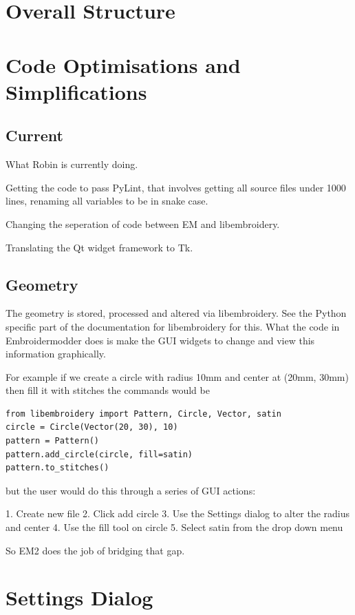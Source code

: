 \documentclass[11pt]{report}
\begin{document}
\section{Overall Structure}

\section{Code Optimisations and Simplifications}

\subsection{Current}

What Robin is currently doing.

Getting the code to pass PyLint, that involves getting all source files
under 1000 lines, renaming all variables to be in snake case.

Changing the seperation of code between EM and libembroidery.

Translating the Qt widget framework to Tk.

\subsection{Geometry}

The geometry is stored, processed and altered via libembroidery. See the Python
specific part of the documentation for libembroidery for this. What the code in
Embroidermodder does is make the GUI widgets to change and view this information
graphically.

For example if we create a circle with radius 10mm and center at (20mm, 30mm)
then fill it with stitches the commands would be

\begin{lstlisting}
from libembroidery import Pattern, Circle, Vector, satin
circle = Circle(Vector(20, 30), 10)
pattern = Pattern()
pattern.add_circle(circle, fill=satin)
pattern.to_stitches()
\end{lstlisting}

but the user would do this through a series of GUI actions:

1. Create new file
2. Click add circle
3. Use the Settings dialog to alter the radius and center
4. Use the fill tool on circle
5. Select satin from the drop down menu

So EM2 does the job of bridging that gap.

\section{Settings Dialog}
\end{document}
